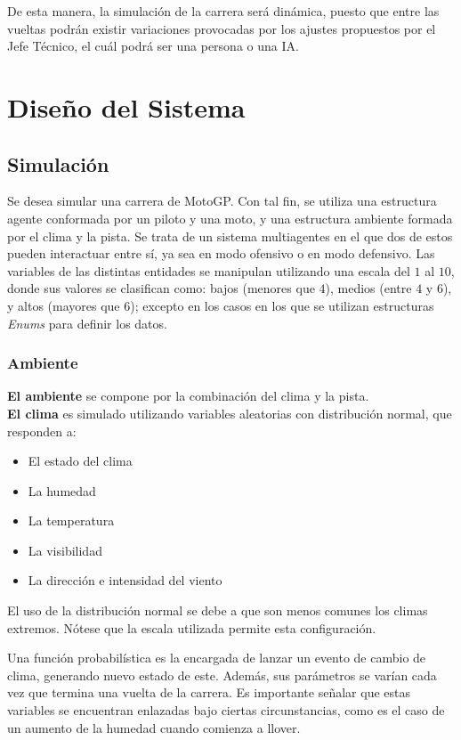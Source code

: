 \documentclass[12pt, letterpaper,spanish]{article}
\theoremstyle{definition}
\theoremstyle{remark}
\begin{document}
	De esta manera, la simulación de la carrera será dinámica, puesto que entre las vueltas podrán existir variaciones provocadas por los ajustes propuestos por el Jefe Técnico, el cuál podrá ser una persona o una IA.\par

\newpage
\section{Diseño del Sistema}
		
	\subsection{Simulación {\footnotesize \cite{conferenciasS}\cite{garcia}}}
	Se desea simular una carrera de MotoGP. Con tal fin, se utiliza una estructura agente conformada por un piloto y una moto, y una estructura ambiente formada por el clima y la pista. Se trata de un sistema multiagentes en el que dos de estos pueden interactuar entre sí, ya sea en modo ofensivo o en modo defensivo. Las variables de las distintas entidades se manipulan utilizando una escala del $1$ al $10$, donde sus valores se clasifican como: bajos (menores que $4$), medios (entre $4$ y $6$), y altos (mayores que $6$); excepto en los casos en los que se utilizan estructuras \emph{Enums} para definir los datos.
	
		\subsubsection{Ambiente}
		\textbf{El ambiente} se compone por la combinación del clima y la pista.\\

		\textbf{El clima} es simulado utilizando variables aleatorias con distribución normal, que responden a:
		\begin{itemize}
    		\item El estado del clima
    		\item La humedad
    		\item La temperatura
		\item La visibilidad
		\item La dirección e intensidad del viento
		\end{itemize}

		El uso de la distribución normal se debe a que son menos comunes los climas extremos. Nótese que la escala utilizada permite esta configuración.

		Una función probabilística es la encargada de lanzar un evento de cambio de clima, generando nuevo estado de este. Además, sus parámetros se varían cada vez que termina una vuelta de la carrera. Es importante señalar que estas variables se encuentran enlazadas bajo ciertas circunstancias, como es el caso de un aumento de la humedad cuando comienza a llover. \\ \\
\end{document}
